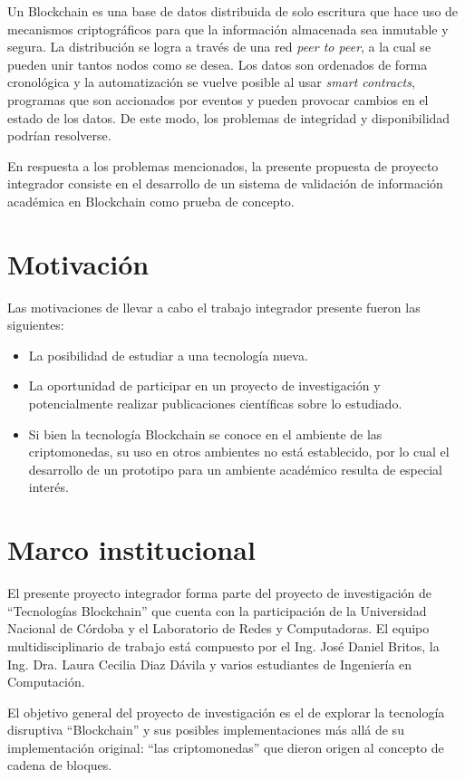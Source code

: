 Un Blockchain es una base de datos distribuida de solo escritura que hace uso de mecanismos criptográficos para que la información almacenada sea inmutable y segura. La distribución se logra a través de una red \textit{peer to peer}, a la cual se pueden unir tantos nodos como se desea. Los datos son ordenados de forma cronológica y la automatización se vuelve posible al usar \textit{smart contracts}, programas que son accionados por eventos y pueden provocar cambios en el estado de los datos. De este modo, los problemas de integridad y disponibilidad podrían resolverse.

En respuesta a los problemas mencionados, la presente propuesta de proyecto integrador consiste en el desarrollo de un sistema de validación de información académica en Blockchain como prueba de concepto.

\section{Motivación}

Las motivaciones de llevar a cabo el trabajo integrador presente fueron las siguientes:
\begin{itemize}
    \item La posibilidad de estudiar a una tecnología nueva.
    \item La oportunidad de participar en un proyecto de investigación y potencialmente realizar publicaciones científicas sobre lo estudiado.
    \item  Si bien la tecnología Blockchain se conoce en el ambiente de las criptomonedas, su uso en otros ambientes no está establecido, por lo cual el desarrollo de un prototipo para un ambiente académico resulta de especial interés.
    
\end{itemize}

\section{Marco institucional}

El presente proyecto integrador forma parte del proyecto de investigación de “Tecnologías Blockchain” que cuenta con la participación de la Universidad Nacional de Córdoba y el Laboratorio de Redes y Computadoras. El equipo multidisciplinario de trabajo está compuesto por el Ing. José Daniel Britos, la Ing. Dra. Laura Cecilia Diaz Dávila y varios estudiantes de Ingeniería en Computación. 

El objetivo general del proyecto de investigación es el de explorar la tecnología disruptiva “Blockchain” y sus posibles implementaciones más allá de su implementación original: “las criptomonedas” que dieron origen al concepto de cadena de bloques.

